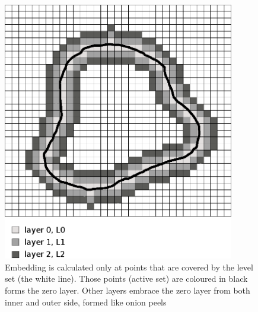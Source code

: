 \begin{figure}
    \centering
    \includegraphics[width=0.9\textwidth]{data/sparsefield}
    \caption[Sparse fields method computation illustration]{Embedding is calculated only at points that are covered by the level set (the white line). Those points (active set) are coloured in black forms the zero layer. Other layers embrace the zero layer from both inner and outer side, formed like onion peels}
    \label{fg:sparseFilelds}
\end{figure}

